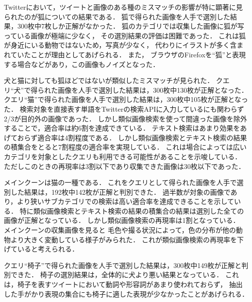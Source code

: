 \documentclass{deimj}
\begin{document}
Twitterにおいて，ツイートと画像のある種のミスマッチの影響が特に顕著に見られたのが狐についての結果である．
狐で得られた画像を人手で選別した結果，300枚中7枚しか正解がなかった．
狐のカテゴリでは収集した画像に狐が写っている画像が極端に少なく，
その選別結果の評価は困難であった．
これは狐が身近にいる動物ではないため，写真が少なく，
代わりにイラストが多く含まれていたことが理由としてあげられる．
また，
ブラウザのFirefoxを“狐”と表現する場合などがあり，この画像もノイズとなった．

犬と猫に対しても狐ほどではないが類似したミスマッチが見られた．
クエリ“犬”で得られた画像を人手で選別した結果は，300枚中130枚が正解となった．
クエリ“猫”で得られた画像を人手で選別した結果は，300枚中105枚が正解となった．
検索対象を直接表す単語をTwitterの検索APIに入力しているにも関わらず2/3が目的外の画像であった．
しかし類似画像検索を使って間違った画像を除外することで，適合率は約6割を達成できている．
テキスト検索はあまり効果をあげておらず適合率は4割程度である．
しかし類似画像検索とテキスト検索の結果の積集合をとると7割程度の適合率を実現している．
これは場合によっては広いカテゴリを対象としたクエリも利用できる可能性があることを示唆している．
ただしこのときの再現率は3割以下であり収集できた画像は30枚以下であった．

メインクーンは猫の一種である．
これをクエリとして得られた画像を人手で選別した結果は，192枚中142枚が正解と判別できた．
過半数が対象の画像であり，より狭いサブカテゴリでの検索は高い適合率を達成できることを示している．
特に類似画像検索とテキスト検索の結果の積集合の結果は選別した全ての画像が正解となっている．
しかし類似画像検索の再現率は1割となっている．
メインクーンの収集画像を見ると
毛色や撮る状況によって，色の分布が他の動物より大きく変動している様子がみられた．
これが類似画像検索の再現率を下げていると考えられる．


クエリ“椅子”で得られた画像を人手で選別した結果は，300枚中149枚が正解と判別できた．
椅子の選別結果は，全体的に犬より悪い結果となっている．
これは，椅子を表すツイートにおいて動詞や形容詞があまり使われておらず，
抽出した手がかり表現の集合にも椅子に適した表現が少なかったことがあげられる．
\end{document}
